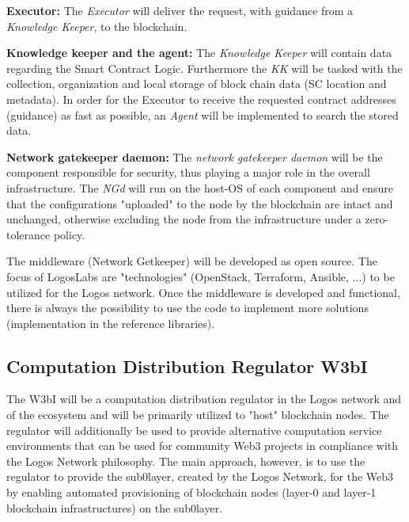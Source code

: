 \documentclass[]{article}
\begin{document}
\textbf{Executor:}
The \textit{Executor} will deliver the request, with guidance from a \textit{Knowledge Keeper}, to the blockchain.   
\newline

\textbf{Knowledge keeper and the agent:}
The \textit{Knowledge Keeper} will contain data regarding the Smart Contract Logic. 
Furthermore the \textit{KK} will be tasked with the collection, organization and local storage of block chain data (SC location and metadata). 
In order for the Executor to receive the requested contract addresses (guidance) as fast as possible, an \textit{Agent} will be implemented to search the stored data.  
\newline

\textbf{Network gatekeeper daemon:}
The \textit{network gatekeeper daemon} will be the component responsible for security, thus playing a major role in the overall infrastructure. 
The \textit{NGd} will run on the host-OS of each component and ensure that the configurations "uploaded" to the node by the blockchain are intact and unchanged, otherwise excluding the node from the infrastructure under a zero-tolerance policy. 
\newline

The middleware (Network Getkeeper) will be developed as open source.
The focus of LogosLabs are "technologies" (OpenStack, Terraform, Ansible, ...) to be utilized for the Logos network.
Once the middleware is developed and functional, there is always the possibility to use the code to implement more solutions (implementation in the reference libraries).  

\subsection{Computation Distribution Regulator W3bI}
The W3bI will be a computation distribution regulator in the Logos network and of the ecosystem and will be primarily utilized to "host" blockchain nodes.
The regulator will additionally be used to provide alternative computation service environments that can be used for community Web3 projects in compliance with the Logos Network philosophy.
The main approach, however, is to use the regulator to provide the sub0layer, created by the Logos Network, for the Web3 by enabling automated provisioning of blockchain nodes (layer-0 and layer-1 blockchain infrastructures) on the sub0layer. 
\end{document}
